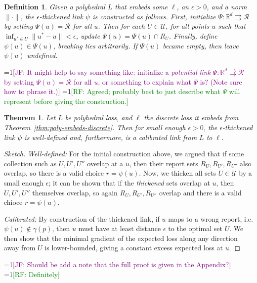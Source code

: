 \documentclass[12pt]{article}
\newcommand{\Comments}{1}
\newcommand{\mynote}[2]{\ifnum\Comments=1\textcolor{#1}{#2}\fi}
\newcommand{\mytodo}[2]{\ifnum\Comments=1%
  \todo[linecolor=#1!80!black,backgroundcolor=#1,bordercolor=#1!80!black]{#2}\fi}
\newcommand{\raf}[1]{\mynote{green}{[RF: #1]}}
\newcommand{\jessie}[1]{\mynote{purple}{[JF: #1]}}
\newcommand{\btw}[1]{}%
\newcommand{\reals}{\mathbb{R}}
\newcommand{\prop}[1]{\mathrm{prop}[#1]}
\newcommand{\R}{\mathcal{R}}
\newcommand{\U}{\mathcal{U}}
\newcommand{\toto}{\rightrightarrows}
\newtheorem{theorem}{Theorem}
\newtheorem{proposition}{Proposition}
\newtheorem{definition}{Definition}
\begin{document}
\begin{definition} \label{def:eps-thick-link}
  Given a polyhedral $L$ that embeds some $\ell$, an $\epsilon > 0$, and a norm $\|\cdot\|$, the \emph{$\epsilon$-thickened link} $\psi$ is constructed as follows.
  First, initialize $\Psi: \reals^d \toto \R$ by setting $\Psi(u) = \R$ for all $u$.
  Then for each $U \in \U$, for all points $u$ such that $\inf_{u^* \in U} \|u^*-u\| < \epsilon$, update $\Psi(u) = \Psi(u) \cap R_U$.
  Finally, define $\psi(u) \in \Psi(u)$, breaking ties arbitrarily.
  If $\Psi(u)$ became empty, then leave $\psi(u)$ undefined.
\end{definition}
\jessie{It might help to say something like: initialize a \emph{potential link} $\Psi: \reals^d \toto \R$ by setting $\Psi(u) = \R$ for all $u$, or something to explain what $\Psi$ is?  (Note sure how to phrase it.)}
\raf{Agreed; probably best to just describe what $\Psi$ will represent before giving the construction.}

\btw{JOURNAL: cool to point out that when $L$ is polyhedral, $\prop{L}$ has a finite range (this result) and so does its (multivalued map) inverse (trim result)!}


\begin{theorem}\label{thm:eps-thick-calibrated}
  Let $L$ be polyhedral loss, and $\ell$ the discrete loss it embeds from Theorem~\ref{thm:poly-embeds-discrete}.
  Then for small enough $\epsilon > 0$, the $\epsilon$-thickened link $\psi$ is well-defined and, furthermore, is a calibrated link from $L$ to $\ell$.
\end{theorem}

\begin{proof}[Sketch]
  \emph{Well-defined:}
  For the initial construction above, we argued that if some collection such as $U,U',U''$ overlap at a $u$, then their report sets $R_U, R_{U'}, R_{U''}$ also overlap, so there is a valid choice $r = \psi(u)$.
  Now, we thicken all sets $U \in \U$ by a small enough $\epsilon$; it can be shown that if the \emph{thickened} sets overlap at $u$, then $U,U',U''$ themselves overlap, so again $R_U, R_{U'}, R_{U''}$ overlap and there is a valid chioce $r = \psi(u)$.

  \emph{Calibrated:} By construction of the thickened link, if $u$ maps to a wrong report, i.e. $\psi(u) \not\in \gamma(p)$, then $u$ must have at least distance $\epsilon$ to the optimal set $U$.
  We then show that the minimal gradient of the expected loss along any direction away from $U$ is lower-bounded, giving a constant excess expected loss at $u$.
\end{proof}
\jessie{Should be add a note that the full proof is given in the Appendix?}
\raf{Definitely}
\end{document}
